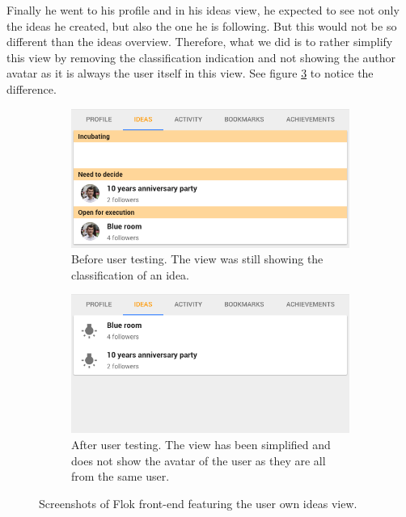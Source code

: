 \documentclass[a4paper,12pt, oneside]{article}
\begin{document}
Finally he went to his profile and in his ideas view, he expected to see not only the ideas he created, but also the one he is following.
But this would not be so different than the ideas overview.
Therefore, what we did is to rather simplify this view by removing the classification indication and not showing the author avatar as it is always the user itself in this view.
See figure \ref{fig.tests.personIdeas} to notice the difference.

\begin{figure}[!htb]
    \begin{subfigure}[t]{.495\textwidth}
        \includegraphics[width=\textwidth]{images/user_tests/personIdeas_before.png}
        \caption{Before user testing. The view was still showing the classification of an idea.}
        \label{fig.tests.personIdeas.before}
    \end{subfigure}
    \hfill
    \begin{subfigure}[t]{.495\textwidth}
        \includegraphics[width=\textwidth]{images/user_tests/personIdeas_after.png}
        \caption{After user testing. The view has been simplified and does not show the avatar of the user as they are all from the same user.}
        \label{fig.tests.personIdeas.after}
    \end{subfigure}
    \caption{Screenshots of Flok front-end featuring the user own ideas view.}
    \label{fig.tests.personIdeas}
\end{figure}
\end{document}
